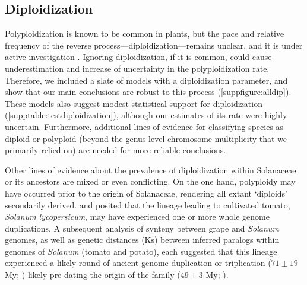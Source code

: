 \subsection*{Diploidization}

Polyploidization is known to be common in plants, but the pace and relative frequency of the reverse process---diploidization---remains unclear, and it is under active investigation \citep{dodsworth_2015,mandakova_2018}. %
Ignoring diploidization, if it is common, could cause underestimation and increase of uncertainty in  the polyploidization rate. 
Therefore, we included a slate of models with a diploidization parameter, and show that our main conclusions are robust to this process (\cref{suppfigure:alldip}).
These models also suggest modest statistical support for diploidization (\cref{supptable:testdiploidization}), although our estimates of its rate were highly uncertain. 
Furthermore, additional lines of evidence for classifying species as diploid or polyploid (beyond the genus-level chromosome multiplicity that we primarily relied on) are needed for more reliable conclusions.

Other lines of evidence about the prevalence of diploidization within Solanaceae or its ancestors are mixed or even conflicting.
On the one hand, polyploidy may have occurred prior to the origin of Solanaceae, rendering all extant `diploids' secondarily derived.
 and \citet{blanc2004} posited that the lineage leading to cultivated tomato, \emph{Solanum lycopersicum}, may have experienced one or more whole genome duplications.
A subsequent analysis of synteny between grape and \emph{Solanum} genomes, as well as genetic distances (Ks) between inferred paralogs within genomes of \emph{Solanum} (tomato and potato), each suggested that this lineage experienced a likely round of ancient genome duplication or triplication ($71 \pm 19$ My; \citealt{tomato2012})  likely pre-dating the origin of the family ($49 \pm 3$ My; \citealt{sarkinen_2013}). 

